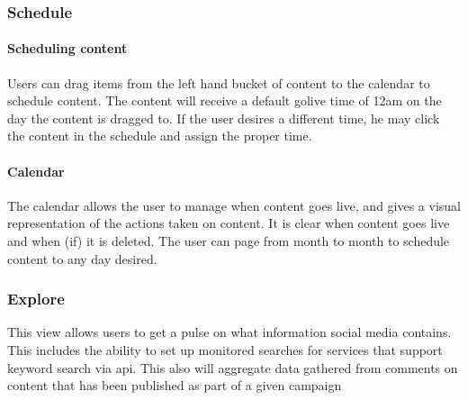\documentclass{report}
\begin{document}
        \subsubsection{Schedule}
        \paragraph{Scheduling content}
        Users can drag items from the left hand bucket of content to the calendar to schedule content.  The content will receive a default golive time of 12am on the day the content is dragged to.  If the user desires a different time, he may click the content in the schedule and assign the proper time.
        \paragraph{Calendar}
        The calendar allows the user to manage when content goes live, and gives a visual representation of the actions taken on content.  It is clear when content goes live and when (if) it is deleted.  The user can page from month to month to schedule content to any day desired.
        \subsubsection{Explore}
        This view allows users to get a pulse on what information social media contains.  This includes the ability to set up monitored searches for services that support keyword search via api.  This also will aggregate data gathered from comments on content that has been published as part of a given campaign
\end{document}
